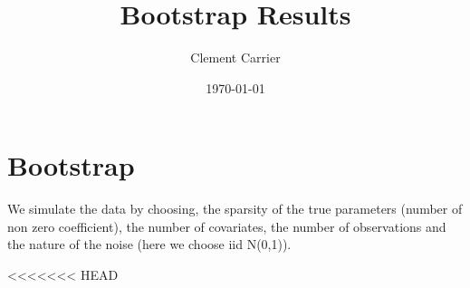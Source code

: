 \documentclass[11pt,oneside, a4paper]{amsart}\usepackage[]{graphicx}\usepackage[]{color}
\begin{document}
  
\title{Bootstrap Results}   
\author{Clement Carrier}
\date{\today}
\maketitle


\section*{Bootstrap}










We simulate the data by choosing, the sparsity of the true parameters (number of non zero coefficient), the number of covariates, the number of observations and the nature of the noise (here we choose iid N(0,1)). 







<<<<<<< HEAD
\begin{table}[ht]
\centering
\caption{Simulation Result: increasing n, varying scale of beta.} 
\label{n_table}
{\footnotesize
{}
}
\end{table}
\end{document}
